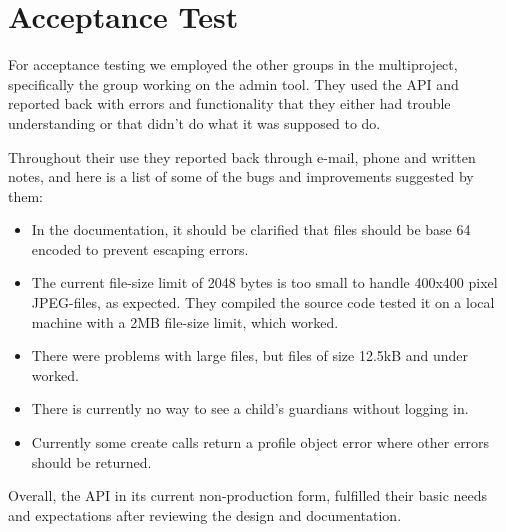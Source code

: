 \section{Acceptance Test}
For acceptance testing we employed the other groups in the multiproject, specifically the group working on the admin tool. They used the API and reported back with errors and functionality that they either had trouble understanding or that didn't do what it was supposed to do. 

Throughout their use they reported back through e-mail, phone and written notes, and here is a list of some of the bugs and improvements suggested by them:

\begin{itemize}
\item In the documentation, it should be clarified that files should be base 64 encoded to prevent escaping errors.
\item The current file-size limit of 2048 bytes is too small to handle 400x400 pixel JPEG-files, as expected. They compiled the source code tested it on a local machine with a 2MB file-size limit, which worked. 
\item There were problems with large files, but files of size 12.5kB and under worked.
\item There is currently no way to see a child's guardians without logging in.
\item Currently some create calls return a profile object error where other errors should be returned.
\end{itemize}

Overall, the API in its current non-production form, fulfilled their basic needs and expectations after reviewing the design and documentation.